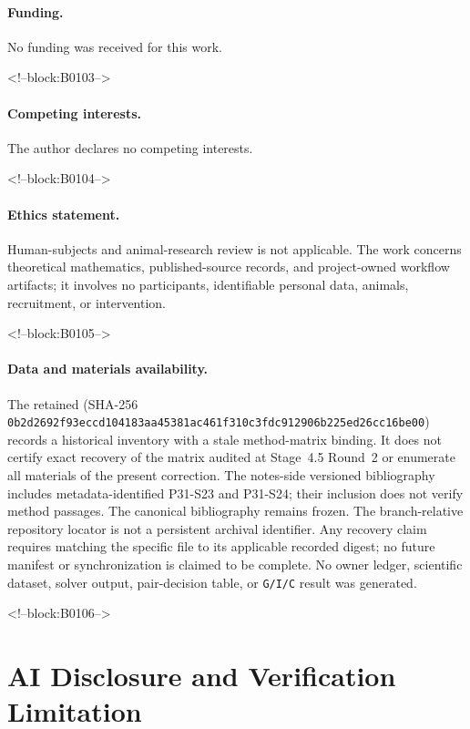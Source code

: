 \documentclass[11pt]{article}
\begin{document}
\paragraph{Funding.} No funding was received for this work.

<!--block:B0103-->
\paragraph{Competing interests.} The author declares no competing
interests.

<!--block:B0104-->
\paragraph{Ethics statement.} Human-subjects and animal-research review
is not applicable. The work concerns theoretical mathematics,
published-source records, and project-owned workflow artifacts; it
involves no participants, identifiable personal data, animals,
recruitment, or intervention.

<!--block:B0105-->
\paragraph{Data and materials availability.}\begingroup\sloppy
The retained
 (SHA-256
\texttt{0b2d2692f93eccd1\allowbreak{}04183aa45381ac46\allowbreak{}1f310c3fdc912906\allowbreak{}b225ed26cc16be00})
records a historical inventory with a stale method-matrix binding. It does not
certify exact recovery of the matrix audited at Stage~4.5 Round~2 or enumerate
all materials of the present correction. The notes-side versioned bibliography
includes metadata-identified P31-S23 and P31-S24; their inclusion does not verify
method passages. The canonical bibliography remains frozen. The branch-relative
repository locator is not a persistent archival identifier. Any recovery claim
requires matching the specific file to its applicable recorded digest; no
future manifest or synchronization is claimed to be complete. No owner ledger,
scientific dataset, solver output, pair-decision table, or \texttt{G/I/C}
result was generated.
\par\endgroup

<!--block:B0106-->
\hypertarget{ai-disclosure-and-verification-limitation}{%
\section*{AI Disclosure and Verification
Limitation}\label{ai-disclosure-and-verification-limitation}}
\end{document}

